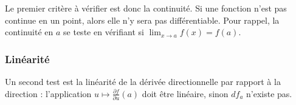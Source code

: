 Le premier critère à vérifier est donc la continuité. Si une fonction n'est pas continue en un point, alors elle n'y sera pas différentiable. Pour rappel, la continuité en \( a\) se teste en vérifiant si \( \lim_{x\to a}f(x)=f(a)\).

\subsubsection{Linéarité}

Un second test est la linéarité de la dérivée directionnelle par rapport à la direction : l'application \( u\mapsto\frac{ \partial f }{ \partial u }(a)\) doit être linéaire, sinon \( df_a\) n'existe pas.

